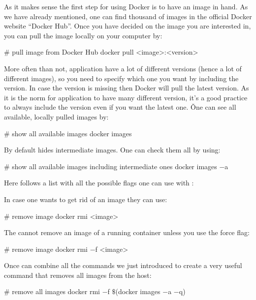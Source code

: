 As it makes sense the first step for using Docker is to have an image in hand. As we have already mentioned, one can
find thousand of images in the official Docker website ``Docker Hub''. Once you have decided on the image you are
interested in, you can pull the image locally on your computer by:

\begin{bash}
# pull image from Docker Hub
docker pull <image>:<version>
\end{bash}

More often than not, application have a lot of different versions (hence a lot of different images), so you need to
specify which one you want by including the version. In case the version is missing then Docker will pull the latest
version. As it is the norm for application to have many different version, it's a good practice to always include the
version even if you want the latest one. \v

One can see all available, locally pulled images by:

\begin{bash}
# show all available images
docker images
\end{bash}

By default  hides intermediate images. One can check them all by using:

\begin{bash}
# show all available images including intermediate ones
docker images $-$a
\end{bash}

Here follows a list with all the possible flags one can use with :


In case one wants to get rid of an image they can use:

\begin{bash}
# remove image
docker rmi <image>
\end{bash}

The  cannot remove an image of a running container unless you use the force  flag:

\begin{bash}
# remove image
docker rmi $-$f <image>
\end{bash}

Once can combine all the commands we just introduced to create a very useful command that removes all images from the
host:

\begin{bash}
# remove all images
docker rmi $-$f $\$$(docker images $-$a $-$q)
\end{bash}

